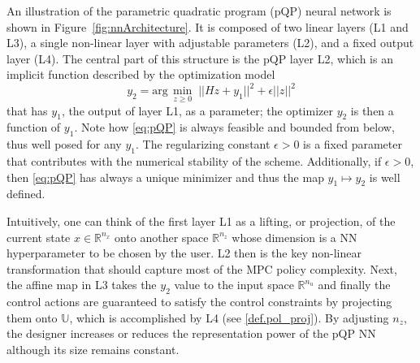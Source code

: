 An illustration of the parametric quadratic program (pQP) neural network is shown in Figure~\ref{fig:nnArchitecture}. It is composed of two linear layers (L1 and L3), a single non-linear layer with adjustable parameters (L2), and a fixed output layer (L4). The central part of this structure is the pQP layer L2, which is an implicit function described by the optimization model
\begin{equation}
	\label{eq:pQP}
	y_2 = \text{arg}\,\min_{z \geq 0} \; ||Hz + y_1||^{2} + \epsilon ||z||^2
\end{equation}
that has $y_1$, the output of layer L1, as a parameter; the optimizer $y_2$ is then a function of $y_1$. Note how \eqref{eq:pQP} is always feasible and bounded from below, thus well posed for any $y_1$. The regularizing constant $\epsilon > 0$ is a fixed parameter that contributes with the numerical stability of the scheme. Additionally, if $\epsilon > 0$, then \eqref{eq:pQP} has always a unique minimizer and thus the map $y_1 \mapsto y_2$ is well defined.

Intuitively, one can think of the first layer L1 as a lifting, or projection, of the current state $x \in \mathbb{R}^{n_x}$ onto another space $\mathbb{R}^{n_z}$ whose dimension is a NN hyperparameter to be chosen by the user. L2 then is the key non-linear transformation that should capture most of the MPC policy complexity. Next, the affine map in L3 takes the $y_2$ value to the input space $\mathbb{R}^{n_u}$ and finally the control actions are guaranteed to satisfy the control constraints by projecting them onto $\mathbb{U}$, which is accomplished by L4 (see \eqref{def.pol_proj}). By adjusting $n_z$, the designer increases or reduces the representation power of the pQP NN although its size remains constant.

